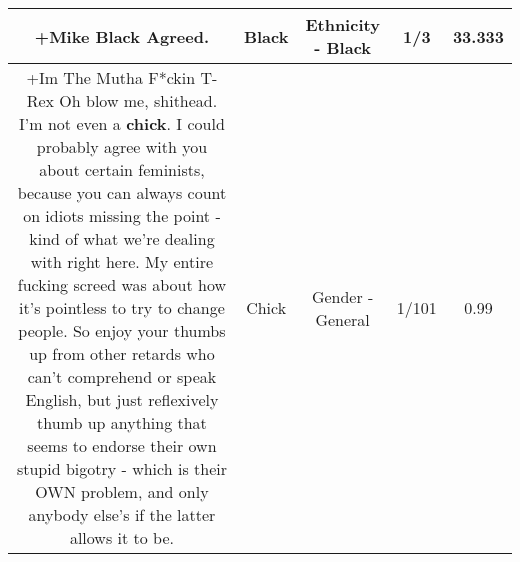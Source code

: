 \documentclass[11pt]{article}
\newlength\mylength
\begin{document}
\begin{center}
\begin{longtable}{|C{.65\mylength}|C{.30\mylength}|C{.12\mylength}|C{.12\mylength}|C{.12\mylength}|}
  \small +Mike \textbf{Black} Agreed.\normalsize   & Black & Ethnicity - Black & 1/3 & 33.333 \\  \hline
  \small +Im The Mutha F*ckin T-Rex Oh blow me, shithead. I'm not even a \textbf{chick}. I could probably agree with you about certain feminists, because you can always count on idiots missing the point - kind of what we're dealing with right here. My entire fucking screed was about how it's pointless to try to change people. So enjoy your thumbs up from other retards who can't comprehend or speak English, but just reflexively thumb up anything that seems to endorse their own stupid bigotry - which is their OWN problem, and only anybody else's if the latter allows it to be.\normalsize   & Chick & Gender - General & 1/101 & 0.99 \\  \hline

\end{longtable}
\end{center}
\end{document}
